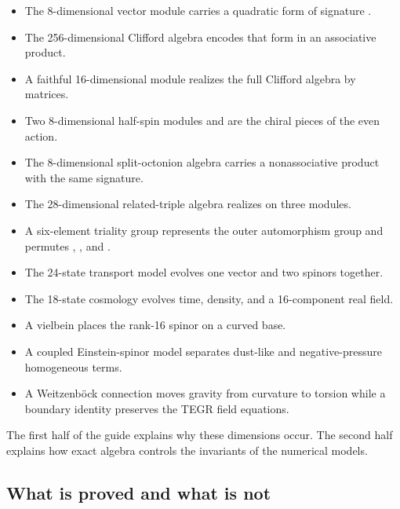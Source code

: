\documentclass[11pt]{article}
\begin{document}
\begin{itemize}
\item The 8-dimensional vector module \texttt{} carries a quadratic form of signature
\texttt{}.

\item The 256-dimensional Clifford algebra \texttt{} encodes that form in an
associative product.

\item A faithful 16-dimensional module realizes the full Clifford algebra by
matrices.

\item Two 8-dimensional half-spin modules \texttt{} and \texttt{} are the chiral pieces of
the even action.

\item The 8-dimensional split-octonion algebra \texttt{} carries a nonassociative
product with the same signature.

\item The 28-dimensional related-triple algebra realizes \texttt{} on three
modules.

\item A six-element triality group represents the outer automorphism group and
permutes \texttt{}, \texttt{}, and \texttt{}.

\item The 24-state transport model evolves one vector and two spinors together.
\item The 18-state cosmology evolves time, density, and a 16-component real field.
\item A vielbein places the rank-16 spinor on a curved \texttt{} base.
\item A coupled Einstein-spinor model separates dust-like and negative-pressure
homogeneous terms.

\item A Weitzenböck connection moves gravity from curvature to torsion while a
boundary identity preserves the TEGR field equations.

\end{itemize}

The first half of the guide explains why these dimensions occur. The second half explains how exact algebra controls the invariants of the numerical models.

\subsection{What is proved and what is not}
\end{document}
